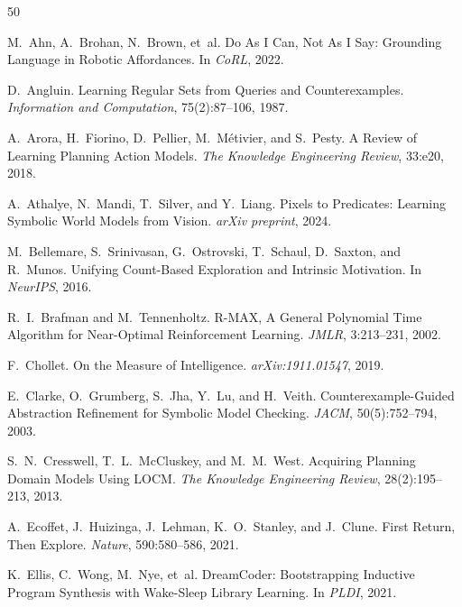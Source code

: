\documentclass{article}
\begin{document}


\begin{thebibliography}{50}

M.~Ahn, A.~Brohan, N.~Brown, et~al.
\newblock Do As I Can, Not As I Say: Grounding Language in Robotic Affordances.
\newblock In \emph{CoRL}, 2022.

D.~Angluin.
\newblock Learning Regular Sets from Queries and Counterexamples.
\newblock \emph{Information and Computation}, 75(2):87--106, 1987.

A.~Arora, H.~Fiorino, D.~Pellier, M.~M{\'e}tivier, and S.~Pesty.
\newblock A Review of Learning Planning Action Models.
\newblock \emph{The Knowledge Engineering Review}, 33:e20, 2018.

A.~Athalye, N.~Mandi, T.~Silver, and Y.~Liang.
\newblock Pixels to Predicates: Learning Symbolic World Models from Vision.
\newblock \emph{arXiv preprint}, 2024.

M.~Bellemare, S.~Srinivasan, G.~Ostrovski, T.~Schaul, D.~Saxton, and R.~Munos.
\newblock Unifying Count-Based Exploration and Intrinsic Motivation.
\newblock In \emph{NeurIPS}, 2016.

R.~I.~Brafman and M.~Tennenholtz.
\newblock R-MAX, A General Polynomial Time Algorithm for Near-Optimal Reinforcement Learning.
\newblock \emph{JMLR}, 3:213--231, 2002.

F.~Chollet.
\newblock On the Measure of Intelligence.
\newblock \emph{arXiv:1911.01547}, 2019.

E.~Clarke, O.~Grumberg, S.~Jha, Y.~Lu, and H.~Veith.
\newblock Counterexample-Guided Abstraction Refinement for Symbolic Model Checking.
\newblock \emph{JACM}, 50(5):752--794, 2003.

S.~N.~Cresswell, T.~L.~McCluskey, and M.~M.~West.
\newblock Acquiring Planning Domain Models Using LOCM.
\newblock \emph{The Knowledge Engineering Review}, 28(2):195--213, 2013.

A.~Ecoffet, J.~Huizinga, J.~Lehman, K.~O.~Stanley, and J.~Clune.
\newblock First Return, Then Explore.
\newblock \emph{Nature}, 590:580--586, 2021.

K.~Ellis, C.~Wong, M.~Nye, et~al.
\newblock DreamCoder: Bootstrapping Inductive Program Synthesis with Wake-Sleep Library Learning.
\newblock In \emph{PLDI}, 2021.


\end{thebibliography}
\end{document}
